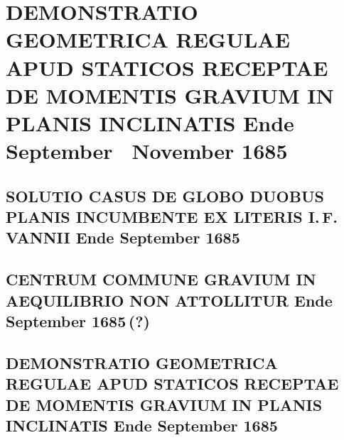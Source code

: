 \documentclass[%
fontsize=10pt,
]{scrbook}
\DeclareRobustCommand{\bracks}[1]{%
\textup{\lbrack}#1\textup{\rbrack}}
\begin{document}
\label{60309}





\chapter[tocentry={Demonstratio geometrica regulae apud Staticos receptae de momentis gravium in planis inclinatis
\enskip \bracks{Ende September \textendash\ November 1685}%
},
head={Demonstratio geometrica regulae apud Staticos receptae}]%
{\MakeUppercase{Demonstratio geometrica regulae apud Staticos receptae de momentis gravium in planis inclinatis} 
\newline \bracks{Ende September \textendash\ November 1685}%
}

\label{intro_vanni-demonstratio}

\section[tocentry={Solutio casus de globo duobus planis incumbente ex literis I.\,F. Vannii
\enskip \bracks{Ende September 1685}%
},
head={Solutio casus \bracks{...}  ex literis I.\,F. Vannii}]%
{\MakeUppercase{Solutio casus de globo duobus planis incumbente ex literis I.\,F. Vannii}
\newline \bracks{Ende September 1685}%
}
\label{32310}

\section[tocentry={Centrum commune gravium connexorum in aequilibrio non attollitur
\enskip \bracks{Ende September 1685\,(?)}%
},
head={Centrum commune gravium connexorum in aequilibrio}]
{\MakeUppercase{Centrum commune gravium in aequilibrio non attollitur}
\newline \bracks{Ende September 1685\,(?)}%
}
\label{60341}

\section[tocentry={Demonstratio geometrica regulae apud staticos receptae de momentis gravium in planis inclinatis
\enskip \bracks{Ende September 1685}%
},
head={Demonstratio geometrica regulae apud staticos receptae}]%
{\MakeUppercase{Demonstratio geometrica regulae apud staticos receptae de momentis gravium in planis inclinatis} 
\newline \bracks{Ende September 1685}%
}
\label{32313}

\end{document}
